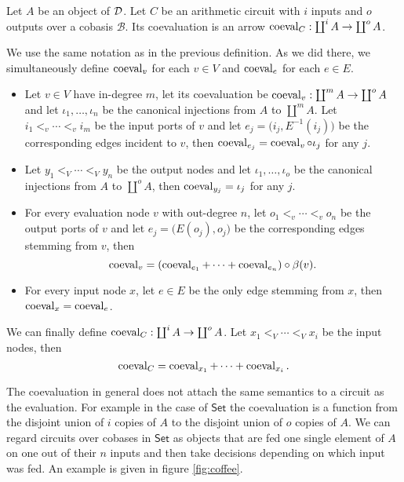 \begin{definition}
  \label{def:coeval}
  Let $A$ be an object of $\mathcal{D}$.  Let $C$ be an arithmetic circuit with
  $i$ inputs and $o$ outputs over a cobasis $\mathcal{B}$. Its
  coevaluation is an arrow $\operatorname{coeval}_C:\coprod^iA\rightarrow\coprod^oA$.

  We use the same notation as in the previous definition. As we did
  there, we simultaneously define $\operatorname{coeval}_v$ for each $v\in V$ and
  $\operatorname{coeval}_e$ for each $e\in E$.
  \begin{itemize}
  \item Let $v\in V$ have in-degree $m$, let its coevaluation be
    $\operatorname{coeval}_v:\coprod^mA\rightarrow\coprod^oA$ and let $\iota_1,\ldots,\iota_n$ be the
    canonical injections from $A$ to $\coprod^mA$. Let $i_1<_v\cdots<_vi_m$
    be the input ports of $v$ and let
    $e_j=\bigl(i_j,E^{-1}(i_j)\bigr)$ be the corresponding edges
    incident to $v$, then $\operatorname{coeval}_{e_j} = \operatorname{coeval}_v\circ\iota_j$ for any
    $j$.
  \item Let $y_1<_V\cdots<_Vy_n$ be the output nodes and let
    $\iota_1,\ldots,\iota_o$ be the canonical injections from $A$ to
    $\coprod^oA$, then $\operatorname{coeval}_{y_j}=\iota_j$ for any $j$.
  \item For every evaluation node $v$ with out-degree $n$, let
    $o_1<_v\cdots<_vo_n$ be the output ports of $v$ and let
    $e_j=\bigl(E(o_j),o_j\bigr)$ be the corresponding edges
    stemming from $v$, then
    \begin{equation}
      \label{eq:lave_v}
      \operatorname{coeval}_v = (\operatorname{coeval}_{e_1}+\cdots+\operatorname{coeval}_{e_n}) \circ \beta(v) 
      \text{.}
    \end{equation}
  \item For every input node $x$, let $e\in E$ be the only edge
    stemming from $x$, then $\operatorname{coeval}_x=\operatorname{coeval}_e$.
  \end{itemize}

  We can finally define $\operatorname{coeval}_C:\coprod^iA\rightarrow\coprod^oA$. Let
  $x_1<_V\cdots<_Vx_i$ be the input nodes, then
  \begin{equation}
    \label{eq:lave}
    \operatorname{coeval}_C = \operatorname{coeval}_{x_1}+\cdots+\operatorname{coeval}_{x_i}
    \text{.}
  \end{equation}
\end{definition}

The coevaluation in general does not attach the same semantics to a
circuit as the evaluation. For example in the case of $\mathsf{Set}$
the coevaluation is a function from the disjoint union of $i$ copies
of $A$ to the disjoint union of $o$ copies of $A$. We can regard
circuits over cobases in $\mathsf{Set}$ as objects that are fed one
single element of $A$ on one out of their $n$ inputs and then take
decisions depending on which input was fed. An example is given in
figure \ref{fig:coffee}.

